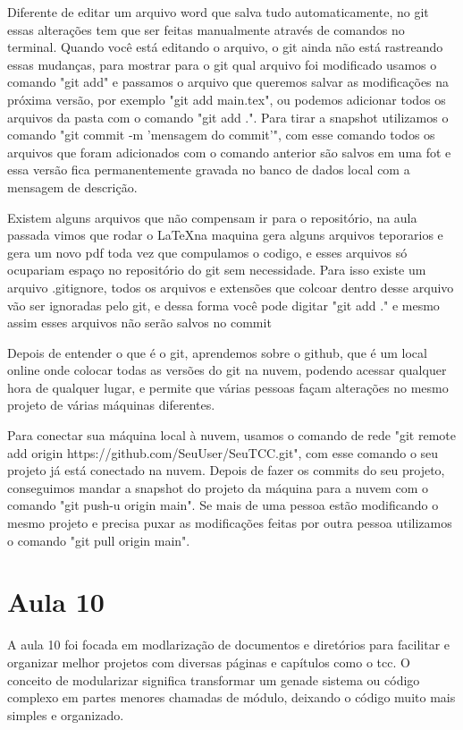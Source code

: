 Diferente de editar um arquivo word que salva tudo automaticamente, no git essas alterações tem que ser feitas manualmente através de comandos no terminal. Quando você está editando o arquivo, o git ainda não está rastreando essas mudanças, para mostrar para o git qual arquivo foi modificado usamos o comando "git add" e passamos o arquivo que queremos salvar as modificações na próxima versão, por exemplo "git add main.tex", ou podemos adicionar todos os arquivos da pasta com o comando "git add .". Para tirar a snapshot utilizamos o comando "git commit -m 'mensagem do commit'", com esse comando todos os arquivos que foram adicionados com o comando anterior são salvos em uma fot e essa versão fica permanentemente gravada no banco de dados local com a mensagem de descrição.

Existem alguns arquivos que não compensam ir para o repositório, na aula passada vimos que rodar o \LaTeX na maquina gera alguns arquivos teporarios e gera um novo pdf toda vez que compulamos o codigo, e esses arquivos só ocupariam espaço no repositório do git sem necessidade. Para isso existe um arquivo .gitignore, todos os arquivos e extensões que colcoar dentro desse arquivo vão ser ignoradas pelo git, e dessa forma você pode digitar "git add ." e mesmo assim esses arquivos não serão salvos no commit

Depois de entender o que é o git, aprendemos sobre o github, que é um local online onde colocar todas as versões do git na nuvem, podendo acessar qualquer hora de qualquer lugar, e permite que várias pessoas façam alterações no mesmo projeto de várias máquinas diferentes.

Para conectar sua máquina local à nuvem, usamos o comando de rede "git remote add origin https://github.com/SeuUser/SeuTCC.git", com esse comando o seu projeto já está conectado na nuvem. Depois de fazer os commits do seu projeto, conseguimos mandar a snapshot do projeto da máquina para a nuvem com o comando "git push-u origin main". Se mais de uma pessoa estão modificando o mesmo projeto e precisa puxar as modificações feitas por outra pessoa utilizamos o comando "git pull origin main".



\section{Aula 10}

A aula 10 foi focada em modlarização de documentos e diretórios para facilitar e organizar melhor projetos com diversas páginas e capítulos como o tcc. O conceito de modularizar significa transformar um genade sistema ou código complexo em partes menores chamadas de módulo, deixando o código muito mais simples e organizado. 

